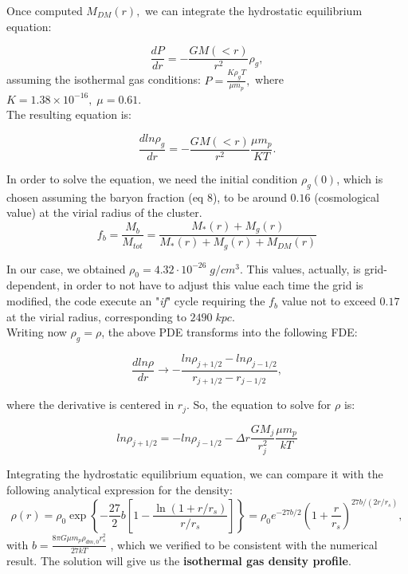 \documentclass{article}
\begin{document}
Once computed \(M_{DM}(r),\) we can integrate the hydrostatic equilibrium equation:

\begin{equation}
    \frac{dP}{dr}=-\frac{GM(<r)}{r^{2}}\rho_{g},
\end{equation}
 assuming the isothermal gas conditions: $ P=\frac{K\rho_{g}T}{\mu m_{p}}, $ where $ K=1.38\times 10^{-16}, \; \mu=0.61$.\\ 
 The resulting equation is:

\begin{equation}
    \frac{dln\rho_{g}}{dr}=-\frac{GM(<r)}{r^{2}}\frac{\mu m_{p}}{KT}.
\end{equation}

In order to solve the equation, we need the initial condition $\rho_{g}(0)$, which is chosen assuming the baryon fraction (eq 8), to be around \(0.16\) (cosmological value) at the virial radius of the cluster.\\ 

\begin{equation}
f_{b}=\frac{M_b}{M_{tot}}=\frac{M_{*}(r)+M_{g}(r)}{M_{*}(r)+M_{g}(r)+M_{DM}(r)}
\end{equation}

In our case, we obtained \(\rho_{0}=4.32\cdot 10^{-26}\; g/cm^{3}\). This values, actually, is grid-dependent, in order to not have to adjust this value each time the grid is modified, the code execute an "\textit{if}" cycle requiring the $f_{b}$ value not to exceed $0.17$ at the virial radius, corresponding to $2490\; kpc.$ \\
Writing now \(\rho_{g}=\rho\), the above PDE transforms into the following FDE:

\begin{equation}
    \frac{dln\rho}{dr} \rightarrow -\frac{ln\rho_{j+1/2}-ln\rho_{j-1/2}}{r_{j+1/2}-r_{j-1/2}},
\end{equation}

where the derivative is centered in \(r_{j}\). So, the equation to solve for \(\rho\) is:

\begin{equation}
    {ln\rho_{j+1/2}=-ln\rho_{j-1/2}-\Delta r \frac{GM_{j}}{r_{j}^{2}}\frac{\mu m_{p}}{kT}}
\end{equation}


Integrating the hydrostatic equilibrium equation, we can compare it with the following analytical expression for the density:
\begin{equation}\rho(r)=\rho_{0}\exp \left\{  -\frac{27}{2}b\left[1-\frac{\ln(1+r/r_{s})}{r/r_{s}}\right]\right\} =\rho_{0}e ^{-27b/2} \left(1+\frac{r}{r_{s}}\right)^{27b/(2r/r_{s})},\end{equation}
with \(b=\frac{8 \pi G\mu m_{p}\rho_{dm,0}r_{s}^{2}}{27kT}\) , which we verified to be consistent with the numerical result. The solution will give us the \textbf{isothermal gas density profile}.\\
\end{document}
